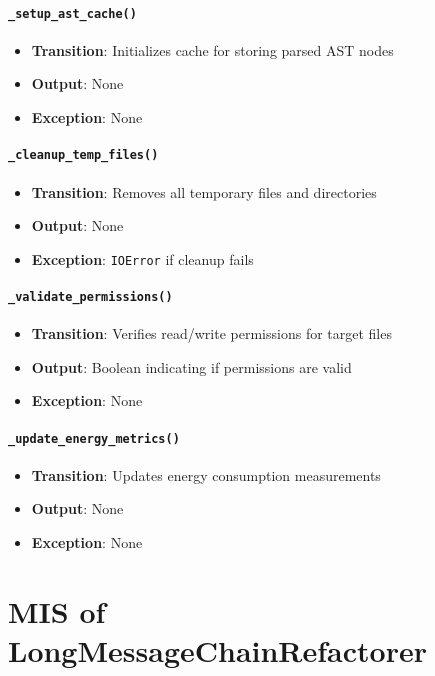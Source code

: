 \documentclass[12pt, titlepage]{article}
\begin{document}
\paragraph{\texttt{\_setup\_ast\_cache()}}
\begin{itemize}
  \item \textbf{Transition}: Initializes cache for storing parsed AST nodes
  \item \textbf{Output}: None
  \item \textbf{Exception}: None
\end{itemize}

\paragraph{\texttt{\_cleanup\_temp\_files()}}
\begin{itemize}
  \item \textbf{Transition}: Removes all temporary files and directories
  \item \textbf{Output}: None
  \item \textbf{Exception}: \texttt{IOError} if cleanup fails
\end{itemize}

\paragraph{\texttt{\_validate\_permissions()}}
\begin{itemize}
  \item \textbf{Transition}: Verifies read/write permissions for target files
  \item \textbf{Output}: Boolean indicating if permissions are valid
  \item \textbf{Exception}: None
\end{itemize}

\paragraph{\texttt{\_update\_energy\_metrics()}}
\begin{itemize}
  \item \textbf{Transition}: Updates energy consumption measurements
  \item \textbf{Output}: None
  \item \textbf{Exception}: None
\end{itemize}

\section{MIS of LongMessageChainRefactorer} \label{mis:LMC}
\end{document}
